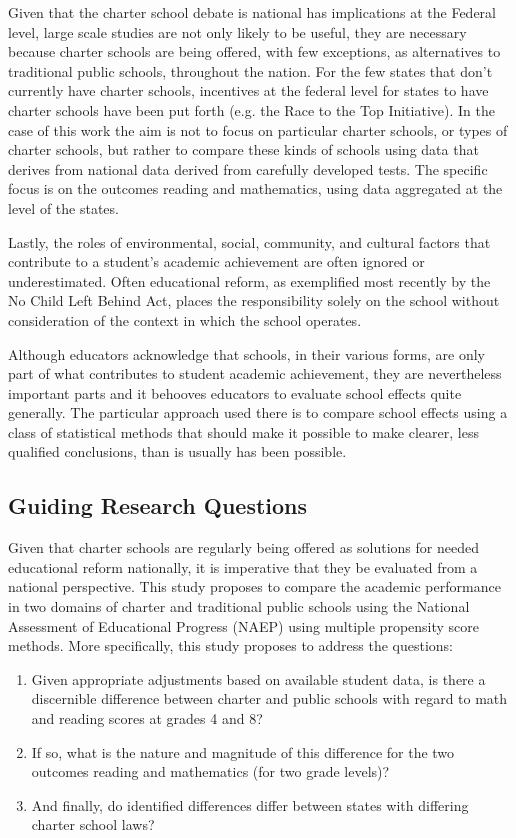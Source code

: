 \documentclass[letterpaper,12pt]{article}
\begin{document}
Given that the charter school debate is national has implications at the Federal level, large scale studies are not only likely to be useful, they are necessary because charter schools are being offered, with few exceptions, as alternatives to traditional public schools, throughout the nation. For the few states that don't currently have charter schools, incentives at the federal level for states to have charter schools have been put forth (e.g. the Race to the Top Initiative). In the case of this work the aim is not to focus on particular charter schools, or types of charter schools, but rather to compare these kinds of schools using data that derives from national data derived from carefully developed tests. The specific focus is on the outcomes reading and mathematics, using data aggregated at the level of the states.

Lastly, the roles of environmental, social, community, and cultural factors that contribute to a student's academic achievement are often ignored or underestimated. Often educational reform, as exemplified most recently by the No Child Left Behind Act, places the responsibility solely on the school without consideration of the context in which the school operates. 

Although educators acknowledge that schools, in their various forms, are only part of what contributes to student academic achievement, they are nevertheless important parts and it behooves educators to evaluate school effects quite generally. The particular approach used there is to compare school effects using a class of statistical methods that should make it possible to make clearer, less qualified conclusions, than is usually has been possible. 

\subsection{Guiding Research Questions} 
Given that charter schools are regularly being offered as solutions for needed educational reform nationally, it is imperative that they be evaluated from a national perspective. This study proposes to compare the academic performance in two domains of charter and traditional public schools using the National Assessment of Educational Progress (NAEP) using multiple propensity score methods. More specifically, this study proposes to address the questions:

\begin{enumerate} 
	\item Given appropriate adjustments based on available student data, is there a discernible difference between charter and public schools with regard to math and reading scores at grades 4 and 8?
	\item If so, what is the nature and magnitude of this difference for the two outcomes reading and mathematics (for two grade levels)?
	\item And finally, do identified differences differ between states with differing charter school laws? 
\end{enumerate}
\end{document}
